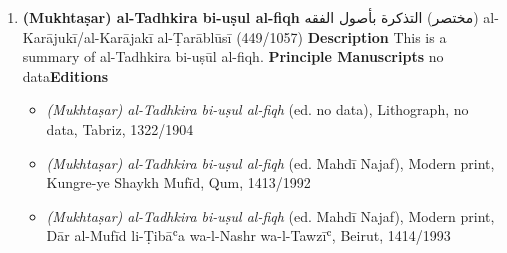 \documentclass{article}
\begin{document}
\begin{enumerate}
      \item \textbf{(Mukhtaṣar) al-Tadhkira bi-uṣul al-fiqh}
        \newline
        \textarabic{مختصر) التذكرة بأصول الفقه)}
        \newline
        al-Karājukī/al-Karājakī al-Ṭarāblūsī
        \newline
        (449/1057)
        \newline
        \newline
        \textbf{Description}
        \newline	
        This is a summary of al-Tadhkira bi-uṣūl al-fiqh.
        \newline
        \newline
    \textbf{Principle Manuscripts}
\newline
no data\newline\textbf{Editions}
\begin{itemize}
        \item \emph{(Mukhtaṣar) al-Tadhkira bi-uṣul al-fiqh} (ed. no data), Lithograph, no data, Tabriz, 1322/1904
        
        \item \emph{(Mukhtaṣar) al-Tadhkira bi-uṣul al-fiqh} (ed. Mahdī Najaf), Modern print, Kungre-ye Shaykh Mufīd, Qum, 1413/1992
        
        \item \emph{(Mukhtaṣar) al-Tadhkira bi-uṣul al-fiqh} (ed. Mahdī Najaf), Modern print, Dār al-Mufīd li-Ṭibāʿa wa-l-Nashr wa-l-Tawzīʿ, Beirut, 1414/1993
        \end{itemize}


\end{enumerate}
\end{document}
